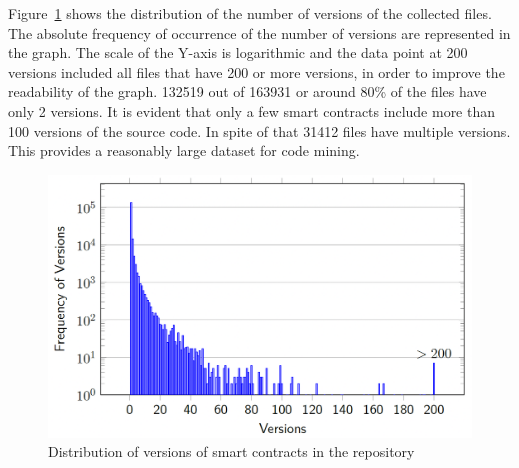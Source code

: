 \documentclass[10pt,conference]{IEEEtran}
\begin{document}
	Figure~\ref{fig:versions} shows the distribution of the number of versions of the collected files. The absolute frequency of occurrence of the number of versions are represented in the graph. The scale of the Y-axis is logarithmic and the data point at 200 versions included all files that have 200 or more versions, in order to improve the readability of the graph. 132519 out of 163931 or around 80\% of the files have only 2 versions. It is evident that only a few smart contracts include more than 100 versions of the source code. In spite of that 31412 files have multiple versions. This provides a reasonably large dataset for code mining.
	
	\begin{figure}[!h]
		\centering
		\includegraphics[scale=0.3]{distr_versions_contracts.png}
		\caption{Distribution of versions of smart contracts in the repository}
		\label{fig:versions}
	\end{figure}
	
\end{document}
